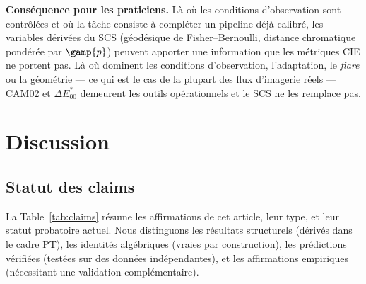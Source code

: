 \documentclass[12pt,a4paper]{article}
\begin{document}
\medskip\noindent\textbf{Cons\'equence pour les praticiens.} L\`a
o\`u les conditions d'observation sont contr\^ol\'ees et o\`u la
t\^ache consiste \`a compl\'eter un pipeline d\'ej\`a calibr\'e, les
variables d\'eriv\'ees du SCS (g\'eod\'esique de Fisher--Bernoulli,
distance chromatique pond\'er\'ee par $\gamp{p}$) peuvent apporter
une information que les m\'etriques CIE ne portent pas. L\`a o\`u
dominent les conditions d'observation, l'adaptation, le \emph{flare}
ou la g\'eom\'etrie --- ce qui est le cas de la plupart des flux
d'imagerie r\'eels --- CAM02 et $\Delta E^*_{00}$ demeurent les outils
op\'erationnels et le SCS ne les remplace pas.

\section{Discussion}
\label{sec:discussion}

\subsection{Statut des claims}

La Table~\ref{tab:claims} r\'esume les affirmations de cet article,
leur type, et leur statut probatoire actuel. Nous distinguons les
r\'esultats structurels (d\'eriv\'es dans le cadre PT), les identit\'es
alg\'ebriques (vraies par construction), les pr\'edictions v\'erifi\'ees
(test\'ees sur des donn\'ees ind\'ependantes), et les affirmations
empiriques (n\'ecessitant une validation compl\'ementaire).
\end{document}
